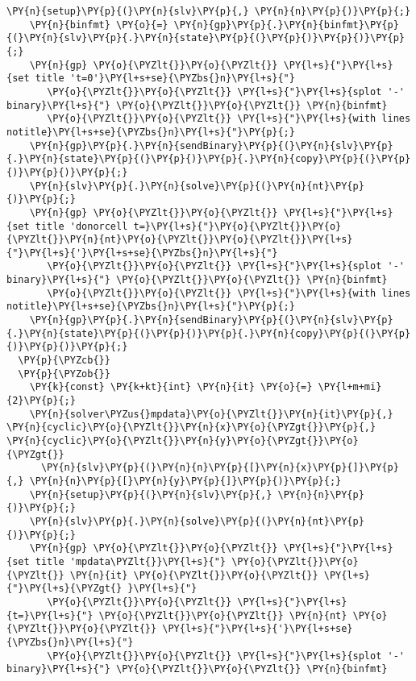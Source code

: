 \begin{Verbatim}[commandchars=\\\{\}]
    \PY{n}{setup}\PY{p}{(}\PY{n}{slv}\PY{p}{,} \PY{n}{n}\PY{p}{)}\PY{p}{;}
    \PY{n}{binfmt} \PY{o}{=} \PY{n}{gp}\PY{p}{.}\PY{n}{binfmt}\PY{p}{(}\PY{n}{slv}\PY{p}{.}\PY{n}{state}\PY{p}{(}\PY{p}{)}\PY{p}{)}\PY{p}{;}
    \PY{n}{gp} \PY{o}{\PYZlt{}}\PY{o}{\PYZlt{}} \PY{l+s}{"}\PY{l+s}{set title 't=0'}\PY{l+s+se}{\PYZbs{}n}\PY{l+s}{"}
       \PY{o}{\PYZlt{}}\PY{o}{\PYZlt{}} \PY{l+s}{"}\PY{l+s}{splot '-' binary}\PY{l+s}{"} \PY{o}{\PYZlt{}}\PY{o}{\PYZlt{}} \PY{n}{binfmt}
       \PY{o}{\PYZlt{}}\PY{o}{\PYZlt{}} \PY{l+s}{"}\PY{l+s}{with lines notitle}\PY{l+s+se}{\PYZbs{}n}\PY{l+s}{"}\PY{p}{;}
    \PY{n}{gp}\PY{p}{.}\PY{n}{sendBinary}\PY{p}{(}\PY{n}{slv}\PY{p}{.}\PY{n}{state}\PY{p}{(}\PY{p}{)}\PY{p}{.}\PY{n}{copy}\PY{p}{(}\PY{p}{)}\PY{p}{)}\PY{p}{;}
    \PY{n}{slv}\PY{p}{.}\PY{n}{solve}\PY{p}{(}\PY{n}{nt}\PY{p}{)}\PY{p}{;}
    \PY{n}{gp} \PY{o}{\PYZlt{}}\PY{o}{\PYZlt{}} \PY{l+s}{"}\PY{l+s}{set title 'donorcell t=}\PY{l+s}{"}\PY{o}{\PYZlt{}}\PY{o}{\PYZlt{}}\PY{n}{nt}\PY{o}{\PYZlt{}}\PY{o}{\PYZlt{}}\PY{l+s}{"}\PY{l+s}{'}\PY{l+s+se}{\PYZbs{}n}\PY{l+s}{"}
       \PY{o}{\PYZlt{}}\PY{o}{\PYZlt{}} \PY{l+s}{"}\PY{l+s}{splot '-' binary}\PY{l+s}{"} \PY{o}{\PYZlt{}}\PY{o}{\PYZlt{}} \PY{n}{binfmt}
       \PY{o}{\PYZlt{}}\PY{o}{\PYZlt{}} \PY{l+s}{"}\PY{l+s}{with lines notitle}\PY{l+s+se}{\PYZbs{}n}\PY{l+s}{"}\PY{p}{;}
    \PY{n}{gp}\PY{p}{.}\PY{n}{sendBinary}\PY{p}{(}\PY{n}{slv}\PY{p}{.}\PY{n}{state}\PY{p}{(}\PY{p}{)}\PY{p}{.}\PY{n}{copy}\PY{p}{(}\PY{p}{)}\PY{p}{)}\PY{p}{;}
  \PY{p}{\PYZcb{}} 
  \PY{p}{\PYZob{}}
    \PY{k}{const} \PY{k+kt}{int} \PY{n}{it} \PY{o}{=} \PY{l+m+mi}{2}\PY{p}{;}
    \PY{n}{solver\PYZus{}mpdata}\PY{o}{\PYZlt{}}\PY{n}{it}\PY{p}{,} \PY{n}{cyclic}\PY{o}{\PYZlt{}}\PY{n}{x}\PY{o}{\PYZgt{}}\PY{p}{,} \PY{n}{cyclic}\PY{o}{\PYZlt{}}\PY{n}{y}\PY{o}{\PYZgt{}}\PY{o}{\PYZgt{}} 
      \PY{n}{slv}\PY{p}{(}\PY{n}{n}\PY{p}{[}\PY{n}{x}\PY{p}{]}\PY{p}{,} \PY{n}{n}\PY{p}{[}\PY{n}{y}\PY{p}{]}\PY{p}{)}\PY{p}{;} 
    \PY{n}{setup}\PY{p}{(}\PY{n}{slv}\PY{p}{,} \PY{n}{n}\PY{p}{)}\PY{p}{;} 
    \PY{n}{slv}\PY{p}{.}\PY{n}{solve}\PY{p}{(}\PY{n}{nt}\PY{p}{)}\PY{p}{;}
    \PY{n}{gp} \PY{o}{\PYZlt{}}\PY{o}{\PYZlt{}} \PY{l+s}{"}\PY{l+s}{set title 'mpdata\PYZlt{}}\PY{l+s}{"} \PY{o}{\PYZlt{}}\PY{o}{\PYZlt{}} \PY{n}{it} \PY{o}{\PYZlt{}}\PY{o}{\PYZlt{}} \PY{l+s}{"}\PY{l+s}{\PYZgt{} }\PY{l+s}{"}
       \PY{o}{\PYZlt{}}\PY{o}{\PYZlt{}} \PY{l+s}{"}\PY{l+s}{t=}\PY{l+s}{"} \PY{o}{\PYZlt{}}\PY{o}{\PYZlt{}} \PY{n}{nt} \PY{o}{\PYZlt{}}\PY{o}{\PYZlt{}} \PY{l+s}{"}\PY{l+s}{'}\PY{l+s+se}{\PYZbs{}n}\PY{l+s}{"}
       \PY{o}{\PYZlt{}}\PY{o}{\PYZlt{}} \PY{l+s}{"}\PY{l+s}{splot '-' binary}\PY{l+s}{"} \PY{o}{\PYZlt{}}\PY{o}{\PYZlt{}} \PY{n}{binfmt}

\end{Verbatim}
